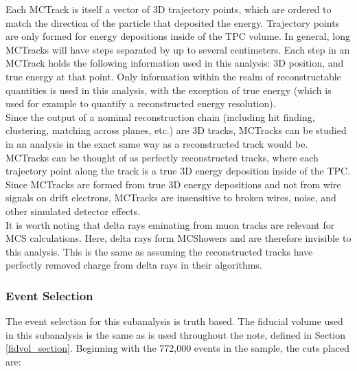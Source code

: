 Each {\sc MCTrack} is itself a vector of 3D trajectory points, which are ordered to match the direction of the particle that deposited the energy. Trajectory points are only formed for energy depositions inside of the TPC volume. In general, long {\sc MCTrack}s will have steps separated by up to several centimeters. Each step in an {\sc MCTrack} holds the following information used in this analysis: 3D position, and true energy at that point. Only information within the realm of reconstructable quantities is used in this analysis, with the exception of true energy (which is used for example to quantify a reconstructed energy resolution).\\

Since the output of a nominal reconstruction chain (including hit finding, clustering, matching across planes, etc.) are 3D tracks, {\sc MCTracks} can be studied in an analysis in the exact same way as a reconstructed track would be. {\sc MCTracks} can be thought of as perfectly reconstructed tracks, where each trajectory point along the track is a true 3D energy deposition inside of the {\ub} TPC.\\

Since {\sc MCTracks} are formed from true 3D energy depositions and not from wire signals on drift electrons, {\sc MCTracks} are insensitive to broken wires, noise, and other simulated detector effects.\\

It is worth noting that delta rays eminating from muon tracks are relevant for MCS calculations. Here, delta rays form {\sc MCShowers} and are therefore invisible to this analysis. This is the same as assuming the reconstructed tracks have perfectly removed charge from delta rays in their algorithms.




\subsubsection{Event Selection}\label{MCBNBMCTrack_eventselection_section}
The event selection for this subanalysis is truth based. The fiducial volume used in this subanalysis is the same as is used throughout the note, defined in Section \ref{fidvol_section}. Beginning with the 772,000 events in the sample, the cuts placed are:


